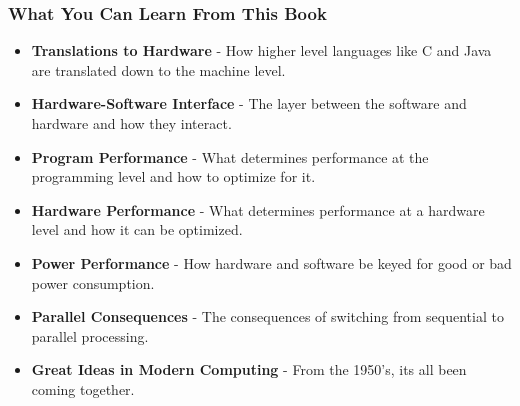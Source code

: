 \documentclass{article}
\begin{document}
			\subsubsection{What You Can Learn From This Book}
			\begin{itemize}
				\item \textbf{Translations to Hardware} - How higher level languages like C and Java are translated down to the machine level.
				\item \textbf{Hardware-Software Interface} - The layer between the software and hardware and how they interact.
				\item \textbf{Program Performance} - What determines performance at the programming level and how to optimize for it.
				\item \textbf{Hardware Performance} - What determines performance at a hardware level and how it can be optimized.
				\item \textbf{Power Performance} - How hardware and software be keyed for good or bad power consumption.
				\item \textbf{Parallel Consequences} - The consequences of switching from sequential to parallel processing.
				\item \textbf{Great Ideas in Modern Computing} - From the 1950's, its all been coming together. 
			\end{itemize}
			
\end{document}
